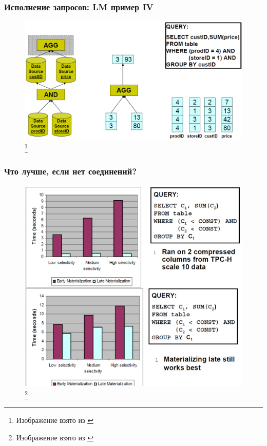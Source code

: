 \documentclass{beamer}
\begin{document}
\begin{frame}
\frametitle{Исполнение запросов: LM пример IV}

\begin{figure}[htb]
\includegraphics[width=\textwidth,height=0.75\textheight,keepaspectratio]{lm4.png} 
\footnote{\tiny{Изображение взято из \cite{Harizopoulos2009}}}
 \end{figure}    

\end{frame}


\begin{frame}
\frametitle{Что лучше, если нет соединений?}

\begin{figure}[htb]
\includegraphics[width=\textwidth,height=0.75\textheight,keepaspectratio]{compare.png} 
\footnote{\tiny{Изображение взято из \cite{Harizopoulos2009}}}
 \end{figure}    

\end{frame}
\end{document}
